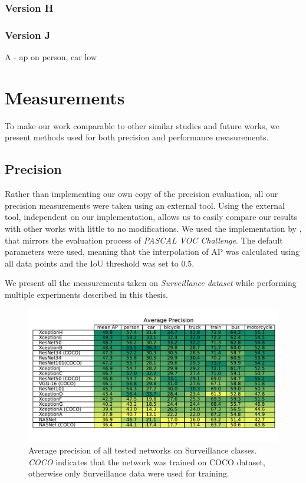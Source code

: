 \subsubsection{Version H}

\subsubsection{Version J}


A - ap on person, car low


\section{Measurements}
To make our work comparable to other similar studies and future works, we present methods used for both precision and performance measurements.

\subsection{Precision}
Rather than implementing our own copy of the precision evaluation, all our precision measurements were taken using an external tool. Using the external tool, independent on our implementation, allows us to easily compare our results with other works with little to no modifications. We used the implementation by \citet{bib:metricsgit}, that mirrors the evaluation process of \textit{PASCAL VOC Challenge}. The default parameters were used, meaning that the interpolation of AP was calculated using all data points and the IoU threshold was set to 0.5. 

We present all the measurements taken on \textit{Surveillance dataset} while performing multiple experiments described in this thesis.


\begin{figure}
    \centering
    \includegraphics[width=\textwidth]{img/ap}
    \caption[Average precision of all tested networks on Surveillance classes]{Average precision of all tested networks on Surveillance classes. \textit{COCO} indicates that the network was trained on COCO dataset, otherwise only Surveillance data were used for training.} 
    \label{fig:ap}
\end{figure}

